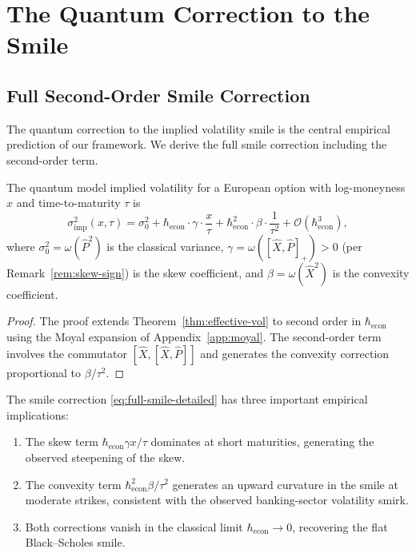 
\section{The Quantum Correction to the Smile}\label{app:smile-correction}

\subsection{Full Second-Order Smile Correction}

The quantum correction to the implied volatility smile is the central empirical
prediction of our framework. We derive the full smile correction including the
second-order term.

\begin{theorem}\label{thm:full-smile}
The quantum model implied volatility for a European option with log-moneyness $x$
and time-to-maturity $\tau$ is
\begin{equation}\label{eq:full-smile-detailed}
    \sigma_{\mathrm{imp}}^2(x, \tau) = \sigma_0^2
    + \hbar_{\mathrm{econ}} \cdot \gamma \cdot \frac{x}{\tau}
    + \hbar_{\mathrm{econ}}^2 \cdot \beta \cdot \frac{1}{\tau^2}
    + \mathcal{O}(\hbar_{\mathrm{econ}}^3),
\end{equation}
where $\sigma_0^2 = \omega(\hat{P}^2)$ is the classical variance,
$\gamma = \omega([\hat{X}, \hat{P}]_+) > 0$ (per Remark~\ref{rem:skew-sign}) is
the skew coefficient, and $\beta = \omega(\hat{X}^2)$ is the convexity
coefficient.
\end{theorem}

\begin{proof}
The proof extends Theorem~\ref{thm:effective-vol} to second order in
$\hbar_{\mathrm{econ}}$ using the Moyal expansion of Appendix~\ref{app:moyal}.
The second-order term involves the commutator $[\hat{X}, [\hat{X}, \hat{P}]]$
and generates the convexity correction proportional to $\beta / \tau^2$.
\end{proof}

\begin{remark}\label{rem:smile-empirical}
The smile correction \eqref{eq:full-smile-detailed} has three important
empirical implications:
\begin{enumerate}
    \item[(i)] The skew term $\hbar_{\mathrm{econ}} \gamma x / \tau$ dominates
        at short maturities, generating the observed steepening of the skew.
    \item[(ii)] The convexity term $\hbar_{\mathrm{econ}}^2 \beta / \tau^2$
        generates an upward curvature in the smile at moderate strikes,
        consistent with the observed banking-sector volatility smirk.
    \item[(iii)] Both corrections vanish in the classical limit
        $\hbar_{\mathrm{econ}} \to 0$, recovering the flat Black--Scholes smile.
\end{enumerate}
\end{remark}

